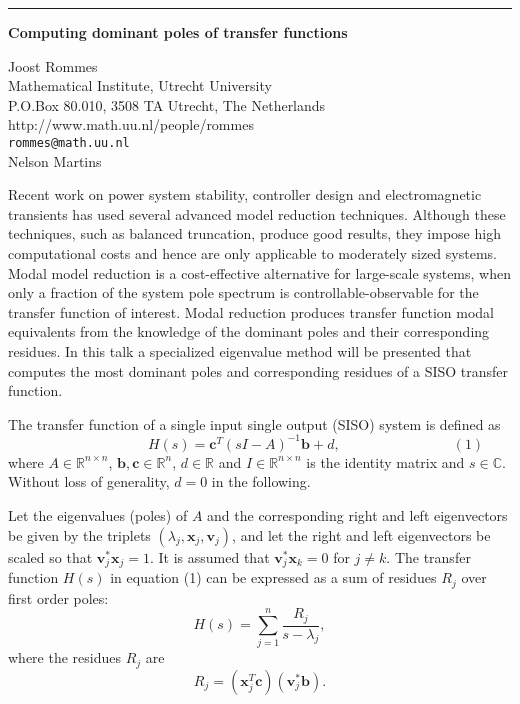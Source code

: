 \documentclass[twosided]{report}
\newcommand{\Reals}{\mathbb{R}}
\newcommand{\Cplex}{\mathbb{C}}
\begin{document}
	\begin{center} \rule{6in}{1pt} \end{center}

\begin{center}
{\large			%
{\bf Computing dominant poles of transfer functions}}

	Joost Rommes \\
	Mathematical Institute, Utrecht University \\
	P.O.Box 80.010, 3508 TA Utrecht, The Netherlands \\
	http://www.math.uu.nl/people/rommes \\
	{\tt rommes@math.uu.nl} \\
	Nelson Martins
\end{center}
Recent work on power system
stability, controller design and electromagnetic transients
has used several advanced model reduction techniques.
Although these techniques, such as balanced truncation,
produce good results, they impose high computational costs
and hence are only applicable to moderately sized systems.
Modal model reduction is a cost-effective alternative for
large-scale systems, when only a fraction of the system pole
spectrum is controllable-observable for the transfer
function of interest. Modal reduction produces transfer
function modal equivalents from the knowledge of the
dominant poles and their corresponding residues. In this
talk a specialized eigenvalue method will be presented that
computes the most dominant poles and corresponding residues
of a SISO transfer function.

The transfer function of a
single input single output (SISO) system is defined as
$$
\qquad
\qquad
\qquad
\qquad
H(s) = \mathbf{c}^T (sI - A)^{-1}\mathbf{b} + d,
\qquad
\qquad
\qquad
\qquad
(1)
$$
where
$A\in\Reals^{n\times n}$,
$\mathbf{b},\mathbf{c}\in\Reals^n$, $d\in\Reals$ and
$I\in\Reals^{n\times n}$ is the identity
matrix and $s\in\Cplex$.
Without loss of generality, $d=0$ in
the following.

Let the eigenvalues (poles) of $A$ and the
corresponding right and left eigenvectors be given by the
triplets $(\lambda_j,\mathbf{x}_j,\mathbf{v}_j)$,
and let the right and
left eigenvectors be scaled so that
$\mathbf{v}_j^*\mathbf{x}_j=1$.
It is
assumed that $\mathbf{v}_j^*\mathbf{x}_k=0$ for $j\neq k$.
The transfer function $H(s)$ in equation (1)
can be expressed as a
sum of residues $R_j$ over first order poles:
$$
H(s) = \sum_{j=1}^n
\frac{R_j}{s - \lambda_j},
$$
where the residues $R_j$ are
$$
R_j = (\mathbf{x}_j^T\mathbf{c})(\mathbf{v}_j^*\mathbf{b}).
$$
\end{document}
